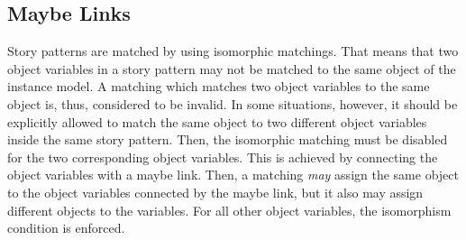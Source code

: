 \subsection{Maybe Links}
\label{sec:StoryPatterns:specialLinks:maybeLink}

Story patterns are matched by using isomorphic matchings. 
That means that two object variables in a story pattern may not be matched to the same object of the instance model. 
A matching which matches two object variables to the same object is, thus, considered to be invalid. 
In some situations, however, it should be explicitly allowed to match the same object to two different object variables inside the same story pattern. 
Then, the isomorphic matching must be disabled for the two corresponding object variables. 
This is achieved by connecting the object variables with a maybe link. 
Then, a matching \emph{may} assign the same object to the object variables connected by the maybe link, but it also may assign different objects to the variables.
For all other object variables, the isomorphism condition is enforced.



